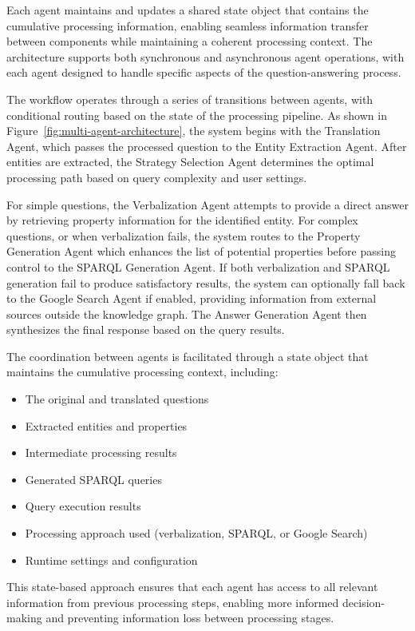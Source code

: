 Each agent maintains and updates a shared state object that contains the cumulative processing information, enabling seamless information transfer between components while maintaining a coherent processing context. The architecture supports both synchronous and asynchronous agent operations, with each agent designed to handle specific aspects of the question-answering process.

The workflow operates through a series of transitions between agents, with conditional routing based on the state of the processing pipeline. As shown in Figure~\ref{fig:multi-agent-architecture}, the system begins with the Translation Agent, which passes the processed question to the Entity Extraction Agent. After entities are extracted, the Strategy Selection Agent determines the optimal processing path based on query complexity and user settings.

For simple questions, the Verbalization Agent attempts to provide a direct answer by retrieving property information for the identified entity. For complex questions, or when verbalization fails, the system routes to the Property Generation Agent which enhances the list of potential properties before passing control to the SPARQL Generation Agent. If both verbalization and SPARQL generation fail to produce satisfactory results, the system can optionally fall back to the Google Search Agent if enabled, providing information from external sources outside the knowledge graph. The Answer Generation Agent then synthesizes the final response based on the query results.

The coordination between agents is facilitated through a state object that maintains the cumulative processing context, including:

\begin{itemize}
    \item The original and translated questions
    \item Extracted entities and properties
    \item Intermediate processing results
    \item Generated SPARQL queries
    \item Query execution results
    \item Processing approach used (verbalization, SPARQL, or Google Search)
    \item Runtime settings and configuration
\end{itemize}

This state-based approach ensures that each agent has access to all relevant information from previous processing steps, enabling more informed decision-making and preventing information loss between processing stages.

